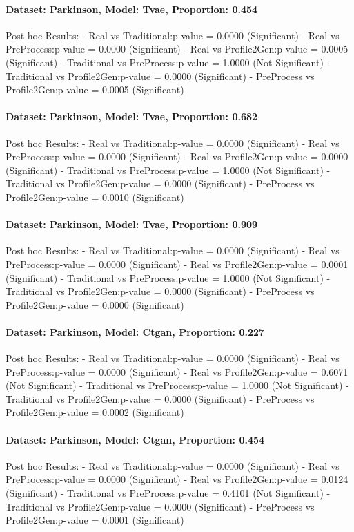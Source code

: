 \documentclass{article}
\theoremstyle{plain}
\theoremstyle{definition}
\theoremstyle{remark}
\begin{document}
\paragraph{Dataset: Parkinson, Model: Tvae, Proportion: 0.454
}Post hoc Results:
- Real vs Traditional:p-value = 0.0000 (Significant)
- Real vs PreProcess:p-value = 0.0000 (Significant)
- Real vs Profile2Gen:p-value = 0.0005 (Significant)
- Traditional vs PreProcess:p-value = 1.0000 (Not Significant)
- Traditional vs Profile2Gen:p-value = 0.0000 (Significant)
- PreProcess vs Profile2Gen:p-value = 0.0005 (Significant)

\paragraph{Dataset: Parkinson, Model: Tvae, Proportion: 0.682
}Post hoc Results:
- Real vs Traditional:p-value = 0.0000 (Significant)
- Real vs PreProcess:p-value = 0.0000 (Significant)
- Real vs Profile2Gen:p-value = 0.0000 (Significant)
- Traditional vs PreProcess:p-value = 1.0000 (Not Significant)
- Traditional vs Profile2Gen:p-value = 0.0000 (Significant)
- PreProcess vs Profile2Gen:p-value = 0.0010 (Significant)

\paragraph{Dataset: Parkinson, Model: Tvae, Proportion: 0.909
}Post hoc Results:
- Real vs Traditional:p-value = 0.0000 (Significant)
- Real vs PreProcess:p-value = 0.0000 (Significant)
- Real vs Profile2Gen:p-value = 0.0001 (Significant)
- Traditional vs PreProcess:p-value = 1.0000 (Not Significant)
- Traditional vs Profile2Gen:p-value = 0.0000 (Significant)
- PreProcess vs Profile2Gen:p-value = 0.0000 (Significant)

\paragraph{Dataset: Parkinson, Model: Ctgan, Proportion: 0.227
}Post hoc Results:
- Real vs Traditional:p-value = 0.0000 (Significant)
- Real vs PreProcess:p-value = 0.0000 (Significant)
- Real vs Profile2Gen:p-value = 0.6071 (Not Significant)
- Traditional vs PreProcess:p-value = 1.0000 (Not Significant)
- Traditional vs Profile2Gen:p-value = 0.0000 (Significant)
- PreProcess vs Profile2Gen:p-value = 0.0002 (Significant)

\paragraph{Dataset: Parkinson, Model: Ctgan, Proportion: 0.454
}Post hoc Results:
- Real vs Traditional:p-value = 0.0000 (Significant)
- Real vs PreProcess:p-value = 0.0000 (Significant)
- Real vs Profile2Gen:p-value = 0.0124 (Significant)
- Traditional vs PreProcess:p-value = 0.4101 (Not Significant)
- Traditional vs Profile2Gen:p-value = 0.0000 (Significant)
- PreProcess vs Profile2Gen:p-value = 0.0001 (Significant)
\end{document}
